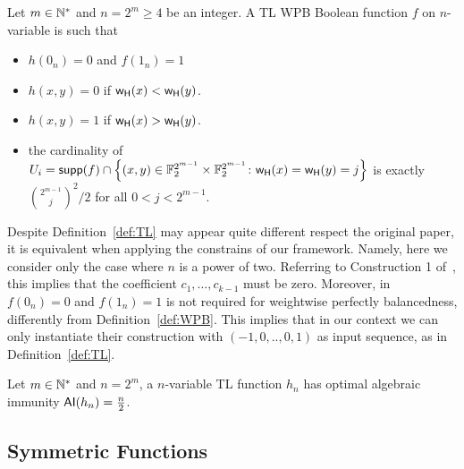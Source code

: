 \documentclass[11pt]{llncs}
\begin{document}
\begin{definition}\label{def:TL}
	Let $m \in \mathbb{N}^*$ and $n = 2^m \ge 4$ be an integer. A TL WPB Boolean function $f$ on $n$-variable is such that
	\begin{itemize}
	 \item $h(0_n)=0$ and $f(1_n)=1$ 
	 \item $h(x,y)=0$ if $\mathsf{w_H}(x)<\mathsf{w_H}(y)$.
	 \item $h(x,y)=1$ if $\mathsf{w_H}(x)>\mathsf{w_H}(y)$.
	 \item the cardinality of $U_i=\mathsf{supp}(f)\cap\left\{(x,y)\in\mathbb{F}_2^{2^{m-1}}\times \mathbb{F}_2^{2^{m-1}}\colon \mathsf{w_H}(x)=\mathsf{w_H}(y)=j\right\}$ is exactly $\binom{2^{m-1}}{j}^2/2$ for all $0<j<2^{m-1}$.
	\end{itemize}	
\end{definition}
\begin{remark}
 Despite Definition~\ref{def:TL} may appear quite different respect the original paper, it is equivalent when applying the constrains of our framework.
 Namely, here we consider only the case where $n$ is a power of two. Referring to Construction 1 of~\cite{CC:TangLiu19}, this implies that the coefficient $c_1,\dots,c_{k-1}$ must be zero. Moreover, in~\cite{CC:TangLiu19} $f(0_n)=0$ and $f(1_n)=1$ is not required for weightwise perfectly balancedness, differently from Definition~\ref{def:WPB}. This implies that in our context we can only instantiate their construction with $(-1,0,..,0,1)$ as input sequence, \ie as in Definition~\ref{def:TL}. 
\end{remark}

\begin{Prop}\label{Prop:TL}
	Let $m \in \mathbb{N}^*$ and $n=2^m$, a  $n$-variable TL function $h_n$ has optimal algebraic immunity $\mathsf{AI}(h_n)=\frac{n}{2}$.
\end{Prop}




\subsection{Symmetric Functions}
\end{document}
